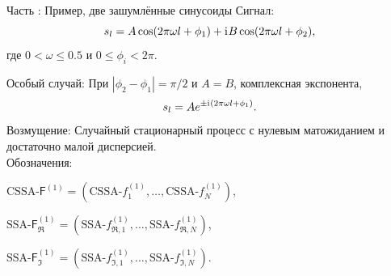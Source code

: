 \documentclass[10pt, ucs, notheorems, handout]{beamer}
\newcommand{\tX}[1]{\mathsf{#1}}
\newcommand{\iu}{\mathrm{i}\mkern1mu}
\newcommand{\RomanNumeralCaps}[1]
{\MakeUppercase{\romannumeral #1}}
\begin{document}
%
%
%
%
%

\begin{frame}{Часть \RomanNumeralCaps{2}: Пример, две зашумлённые синусоиды}
\alert{Сигнал:}
\begin{equation*}
\label{eq:general_ts}
s_l = A\cos(2 \pi\omega l + \phi_1) + \iu B\cos(2 \pi\omega l + \phi_2),
\end{equation*}
где $0<\omega\le 0.5$ и $0\le\phi_i < 2\pi$.

\alert{Особый случай:} При $|\phi_2-\phi_1| = \pi/2$ и $A=B$, комплексная экспонента,
$$s_l = Ae^{\pm \iu(2 \pi\omega l + \phi_1)}.$$
\alert{Возмущение:} Случайный стационарный процесс с нулевым матожиданием и достаточно малой дисперсией.\\
\vspace{1em}
\alert{Обозначения:}

$\text{CSSA-}\tX{F}^{(1)} = (\text{CSSA-}f^{(1)}_1, \ldots, \text{CSSA-}f^{(1)}_N)$,

$\text{SSA-}\tX{F}^{(1)}_{\Re} = (\text{SSA-}f^{(1)}_{\Re, 1}, \ldots, \text{SSA-}f^{(1)}_{\Re, N})$,

$\text{SSA-}\tX{F}^{(1)}_{\Im} = (\text{SSA-}f^{(1)}_{\Im, 1}, \ldots, \text{SSA-}f^{(1)}_{\Im, N})$.
\end{frame}
\end{document}
